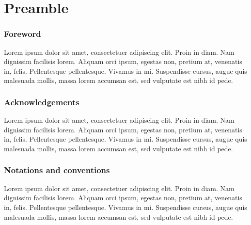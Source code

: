 
\chapter*{Preamble}

\thispagestyle{empty}


\subsection*{Foreword}
Lorem ipsum dolor sit amet, consectetuer adipiscing elit. Proin in diam. Nam dignissim facilisis lorem. Aliquam orci ipsum, egestas non, pretium at, venenatis in, felis. Pellentesque pellentesque. Vivamus in mi. Suspendisse cursus, augue quis malesuada mollis, massa lorem accumsan est, sed vulputate est nibh id pede.

\subsection*{Acknowledgements}
Lorem ipsum dolor sit amet, consectetuer adipiscing elit. Proin in diam. Nam dignissim facilisis lorem. Aliquam orci ipsum, egestas non, pretium at, venenatis in, felis. Pellentesque pellentesque. Vivamus in mi. Suspendisse cursus, augue quis malesuada mollis, massa lorem accumsan est, sed vulputate est nibh id pede.

\subsection*{Notations and conventions}
Lorem ipsum dolor sit amet, consectetuer adipiscing elit. Proin in diam. Nam dignissim facilisis lorem. Aliquam orci ipsum, egestas non, pretium at, venenatis in, felis. Pellentesque pellentesque. Vivamus in mi. Suspendisse cursus, augue quis malesuada mollis, massa lorem accumsan est, sed vulputate est nibh id pede.
